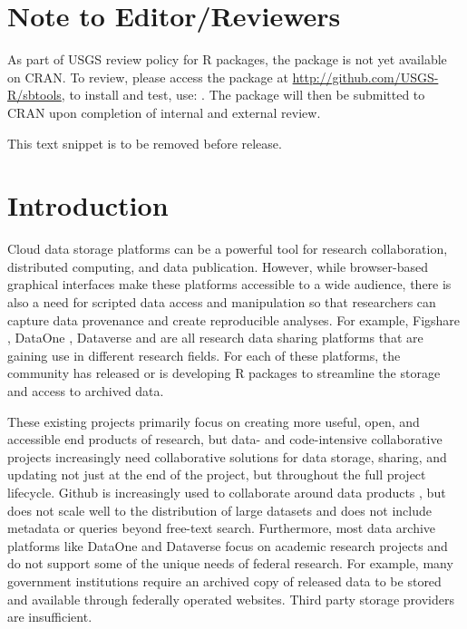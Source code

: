 
\section{Note to Editor/Reviewers}

As part of USGS review policy for R packages, the  package is not 
yet available on CRAN. To review, please access the package at 
\url{http://github.com/USGS-R/sbtools}, to install and test, use: 
. The  package will 
then be submitted to CRAN upon completion of internal and external review. 

This text snippet is to be removed before release.

\section{Introduction}

Cloud data storage platforms can be a powerful tool for research collaboration,
distributed computing, and data publication. However, while browser-based graphical
interfaces make these platforms accessible to a wide audience, there is also
a need for scripted data access and manipulation so that researchers can capture 
data provenance and create reproducible analyses. For example,
Figshare \citep{figshare}, DataOne \citep{dataone}, Dataverse \citep{dataverse} 
and \citep{ckan} are all research data
sharing platforms that are gaining use in different research fields. For each of these
platforms, the community has released \citep{rfigshare, dvn, ckanr} or is
developing \citep{dataonepkg} R packages to streamline the storage and access
to archived data. 

These existing projects primarily focus on creating more useful, open, and
accessible end products of research, but data- and code-intensive collaborative projects
increasingly need collaborative solutions for data storage, sharing, and updating
not just at the end of the project, but throughout the full project lifecycle. 
Github is increasingly used to collaborate around data products \citep{GandrudGithub}, 
but does not scale well to the distribution of large datasets \citep{Delcambre2013} and does not
include metadata or queries beyond free-text search. Furthermore, 
most data archive platforms like DataOne and Dataverse 
focus on academic research projects and do not support some
of the unique needs of federal research. For example, many government institutions
require an archived copy of released data to be stored and available through federally
operated websites. Third party storage providers are insufficient.


